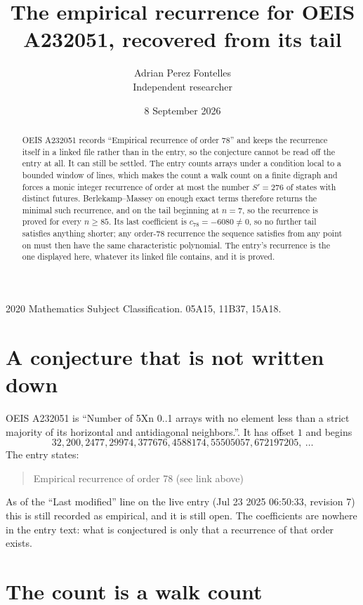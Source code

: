 \documentclass[11pt,a4paper]{article}
\title{The empirical recurrence for OEIS A232051, recovered from its tail}
\author{Adrian Perez Fontelles\\ \small Independent researcher}
\date{8 September 2026}
\theoremstyle{plain}
\theoremstyle{definition}
\begin{document}
\maketitle

\begin{abstract}
OEIS A232051 records ``Empirical recurrence of order $78$'' and keeps the recurrence itself in
a linked file rather than in the entry, so the conjecture cannot be read off the entry at all.
It can still be settled. The entry counts arrays under a condition local to a bounded window of
lines, which makes the count a walk count on a finite digraph and forces a monic integer
recurrence of order at most the number $S'=276$ of states with distinct futures. Berlekamp--Massey on
enough exact terms therefore returns the minimal such recurrence, and on the tail beginning at $n=7$, so the recurrence is proved for every $n\ge85$.
Its last coefficient is $c_{78}=-6080\neq0$, so no further tail satisfies anything
shorter; any order-$78$ recurrence the sequence satisfies from any point on must then have
the same characteristic polynomial. The entry's recurrence is the one displayed here, whatever
its linked file contains, and it is proved.
\end{abstract}

\noindent\small 2020 Mathematics Subject Classification. 05A15, 11B37, 15A18.\normalsize

\section{A conjecture that is not written down}

OEIS A232051 is ``Number of 5Xn 0..1 arrays with no element less than a strict majority of its horizontal and antidiagonal neighbors.''. It has offset $1$ and begins
\[
32, 200, 2477, 29974, 377676, 4588174, 55505057, 672197205,\ \dots
\]
The entry states:
\begin{quote}
Empirical recurrence of order 78 (see link above)
\end{quote}
As of the ``Last modified'' line on the live entry (Jul 23 2025 06:50:33, revision 7)
this is still recorded as empirical, and it is still open. The coefficients are nowhere in the
entry text: what is conjectured is only that a recurrence of that order exists.

\section{The count is a walk count}
\end{document}

